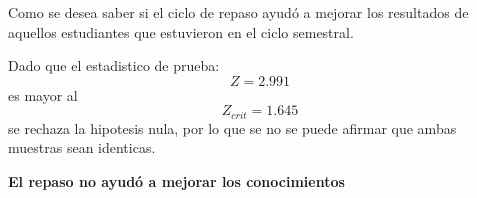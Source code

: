 \begin{frame}

    Como se desea saber si el ciclo de repaso ayudó a mejorar los resultados 
    de aquellos estudiantes que estuvieron en el ciclo semestral.

    Dado que el estadistico de prueba: \[ Z = 2.991 \] es mayor al 
    \[Z_{crit} = 1.645\] se rechaza la hipotesis nula, por lo que se no
    se puede afirmar que ambas muestras sean identicas.

    \textbf{El repaso no ayudó a mejorar los conocimientos}
\end{frame}
